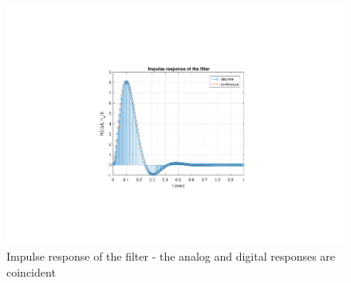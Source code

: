 \begin{figure} [H]
	\centering
	\includegraphics[trim={8cm 4.8cm 8cm 5cm}, clip, width=0.8\linewidth]{impulse_resp}
	\caption{Impulse response of the filter - the analog and digital responses are coincident}
	\label{fig:t2_impulse_resp}
\end{figure}
\pagebreak
